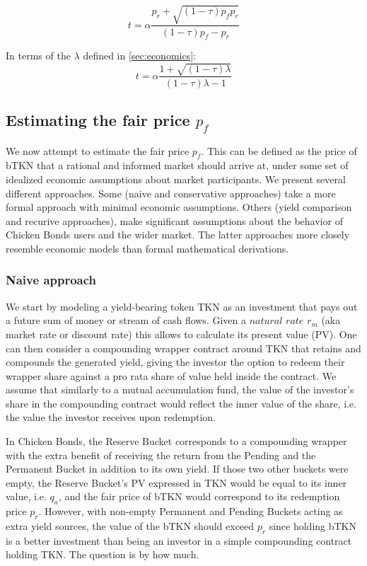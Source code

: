 \documentclass{article}
\begin{document}
\begin{equation}
  \label{eq:optimal_chicken_in_1_fee}
t = \alpha \frac{p_r + \sqrt{(1-\tau)p_f p_r}}{(1-\tau)p_f-p_r}
\end{equation}

In terms of the $\lambda$ defined in \ref{sec:economics}:
\begin{equation}
  \label{eq:optimal_chicken_in_2_fee}
t = \alpha \frac{1 + \sqrt{(1-\tau)\lambda}}{(1-\tau)\lambda - 1}
\end{equation}

\subsection{Estimating the fair price $p_f$}
We now attempt to estimate the fair price $p_f$. This can be defined as the price of bTKN that a rational and informed market should arrive at, under some set of idealized economic assumptions about market participants. We present several different approaches. Some (naive and conservative approaches) take a more formal approach with minimal economic assumptions. Others (yield comparison and recurive approaches), make significant assumptions about the behavior of Chicken Bonds users and the wider market. The latter approaches more closely resemble economic models than formal mathematical derivations.

\subsubsection{Naive approach}
We start by modeling a yield-bearing token TKN as an investment that pays out a future sum of money or stream of cash flows. Given a $\textit{natural rate}$ $r_m$ (aka market rate or discount rate) this allows to calculate its present value (PV). One can then consider a compounding wrapper contract around TKN that retains and compounds the generated yield, giving the investor the option to redeem their wrapper share against a pro rata share of value held inside the contract. We assume that similarly to a mutual accumulation fund, the value of the investor's share in the compounding contract would reflect the inner value of the share, i.e. the value the investor receives upon redemption. 

In Chicken Bonds, the Reserve Bucket corresponds to a compounding wrapper with the extra benefit of receiving the return from the Pending and the Permanent Bucket in addition to its own yield. If those two other buckets were empty, the Reserve Bucket's PV expressed in TKN would be equal to its inner value, i.e. $q_a$, and the fair price of bTKN would correspond to its redemption price $p_r$. However, with non-empty Permanent and Pending Buckets acting as extra yield sources, the value of the bTKN should exceed $p_r$ since holding bTKN is a better investment than being an investor in a simple compounding contract holding TKN. The question is by how much.
\end{document}
